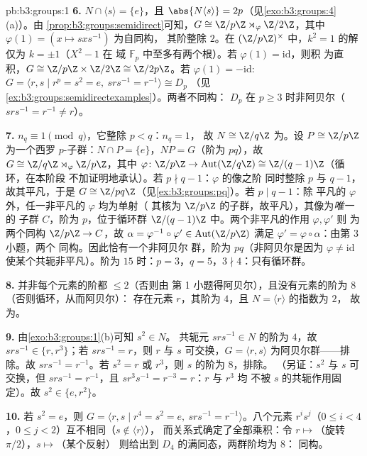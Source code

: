 \begin{solution}{pb:b3:groups:1}
\textbf{6.} $N \cap \langle s \rangle = \{e\}$，且 $\abs{N\langle
s\rangle} = 2p$（见\cref{exo:b3:groups:4}(a)）。由
\cref{prop:b3:groups:semidirect}可知，$G \cong \Z/p\Z \rtimes_\varphi
\Z/2\Z$，其中 $\varphi(1) = (x \mapsto sxs^{-1})$ 为自同构，
其阶整除 $2$。在 $(\Z/p\Z)^\times$ 中，$k^2 = 1$ 的解仅为
$k = \pm 1$（$X^2 - 1$ 在
域 $\mathbb F_p$ 中至多有两个根）。若 $\varphi(1) = \mathrm{id}$，则积
为直积，$G \cong \Z/p\Z \times \Z/2\Z \cong \Z/2p\Z$。若
$\varphi(1) = -\mathrm{id}$: $G = \langle r, s \mid r^p = s^2 = e,
\ srs^{-1} = r^{-1}\rangle \cong D_p$
（见\cref{ex:b3:groups:semidirectexamples}）。两者不同构：
$D_p$ 在 $p \geq 3$ 时非阿贝尔（$srs^{-1} = r^{-1} \neq r$）。

\textbf{7.} $n_q \equiv 1 \pmod q$，它整除 $p < q$：$n_q = 1$，
故 $N \cong \Z/q\Z$ 为。设 $P \cong \Z/p\Z$ 为一个西罗
$p$-子群：$N \cap P = \{e\}$，$NP = G$（阶为 $pq$），故 $G
\cong \Z/q\Z \rtimes_\varphi \Z/p\Z$，其中 $\varphi \colon \Z/p\Z
\to \operatorname{Aut}(\Z/q\Z) \cong \Z/(q-1)\Z$（循环，在本阶段
不加证明地承认）。若 $p \nmid q - 1$：$\varphi$ 的像之阶
同时整除 $p$ 与 $q-1$，故其平凡，于是 $G \cong
\Z/pq\Z$（见\cref{ex:b3:groups:pq}）。若 $p \mid q - 1$：除
平凡的 $\varphi$ 外，任一非平凡的 $\varphi$ 均为单射（
其核为 $\Z/p\Z$ 的子群，故平凡），其像为\emph{唯一}的
子群 $C$，阶为 $p$，位于循环群
$\Z/(q-1)\Z$ 中。两个非平凡的作用 $\varphi, \varphi'$ 则
为两个同构 $\Z/p\Z \to C$，故 $\alpha =
\varphi^{-1}\circ\varphi' \in \operatorname{Aut}(\Z/p\Z)$
满足 $\varphi' = \varphi\circ\alpha$：由第 3 小题，两个
同构。因此恰有一个非阿贝尔
群，阶为 $pq$（非阿贝尔是因为 $\varphi \neq
\mathrm{id}$ 使某个共轭非平凡）。阶为 $15$ 时：$p =
3$，$q = 5$，$3 \nmid 4$：只有循环群。

\textbf{8.} 并非每个元素的阶都 $\leq 2$（否则由
第 1 小题得阿贝尔），且没有元素的阶为 $8$（否则循环，从而阿贝尔）：
存在元素 $r$，其阶为 $4$，且 $N = \langle r\rangle$ 的指数为 $2$，
故为。

\textbf{9.} 由\cref{exo:b3:groups:1}(b)可知 $s^2 \in N$。
共轭元 $srs^{-1} \in N$ 的阶为 $4$，故 $srs^{-1} \in \{r,
r^3\}$；若 $srs^{-1} = r$，则 $r$ 与 $s$ 可交换，$G =
\langle r, s\rangle$ 为阿贝尔群——排除。故 $srs^{-1} =
r^{-1}$。若 $s^2 = r$ 或 $r^3$，则 $s$ 的阶为 $8$，排除。
（另证：$s^2$ 与 $s$ 可交换，但 $s r s^{-1} =
r^{-1}$，且 $s r^3 s^{-1} = r^{-3} = r$：$r$ 与 $r^3$ 均
不被 $s$ 的共轭作用固定）。故 $s^2 \in \{e, r^2\}$。

\textbf{10.} 若 $s^2 = e$，则 $G = \langle r, s \mid r^4 = s^2 = e,\
srs^{-1} = r^{-1}\rangle$。八个元素 $r^is^j$（$0 \leq i
< 4$，$0 \leq j < 2$）互不相同（$s \notin \langle r\rangle$），
而关系式确定了全部乘积：令 $r
\mapsto$（旋转 $\pi/2$），$s \mapsto$（某个反射）
则给出到 $D_4$ 的满同态，两群阶均为 $8$：
同构。


\end{solution}
